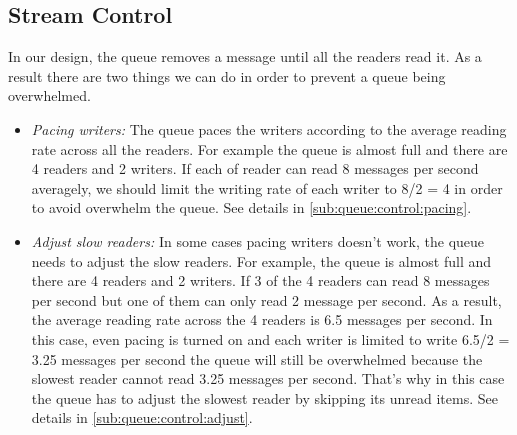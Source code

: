 \subsection{\label{sub:queue:control}{Stream Control}}
In our design, the queue removes a message until all the readers read it. As a result there are two things we can do in order to prevent a queue being overwhelmed.
\begin{itemize}
	\item{\emph{Pacing writers:} The queue paces the writers according to the average reading rate across all the readers. For example the queue is almost full and there are 4 readers and 2 writers. If each of reader can read 8 messages per second averagely, we should limit the writing rate of each writer to 8/2 = 4 in order to avoid overwhelm the queue.  See details in \ref{sub:queue:control:pacing}.}
	\item{\emph{Adjust slow readers:} In some cases pacing writers doesn't work, the queue needs to adjust the slow readers. For example, the queue is almost full and there are 4 readers and 2 writers. If 3 of the 4 readers can read 8 messages per second but one of them can only read 2 message per second. As a result, the average reading rate across the 4 readers is 6.5 messages per second. In this case, even pacing is turned on and each writer is limited to write 6.5/2 = 3.25 messages per second the queue will still be overwhelmed because the slowest reader cannot read 3.25 messages per second. That's why in this case the queue has to adjust the slowest reader by skipping its unread items. See details in \ref{sub:queue:control:adjust}.}
\end{itemize} 

